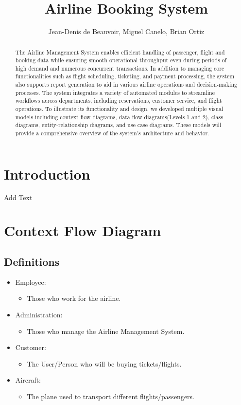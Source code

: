 \documentclass{article}
\title{Airline Booking System}
\author{Jean-Denis de Beauvoir, Miguel Canelo, Brian Ortiz}
\begin{document}
\maketitle

\begin{abstract}
The Airline Management System enables efficient handling of passenger, flight and booking data while ensuring smooth operational throughput even during periods of high demand and numerous concurrent transactions. In addition to managing core functionalities such as flight scheduling, ticketing, and payment processing, the system also supports report generation to aid in various airline operations and decision-making processes. The system integrates a variety of automated modules to streamline workflows across departments, including reservations, customer service, and flight operations. To illustrate its functionality and design, we developed multiple visual models including context flow diagrams, data flow diagrams(Levels 1 and 2), class diagrams, entity-relationship diagrams, and use case diagrams. These models will provide a comprehensive overview of the system's architecture and behavior.
\end{abstract}

\section{Introduction}

Add Text

\section{Context Flow Diagram}

\subsection{Definitions}

\begin{itemize}
\item Employee: \begin{itemize}
    \item Those who work for the airline.
    \end{itemize}
\item Administration:
    \begin{itemize}
    \item Those who manage the Airline Management System.
    \end{itemize}
\item Customer:
    \begin{itemize}
    \item The User/Person who will be buying tickets/flights.
    \end{itemize}
\item Aircraft:
    \begin{itemize}
    \item The plane used to transport different flights/passengers.
    \end{itemize}
\end{itemize}
\end{document}
